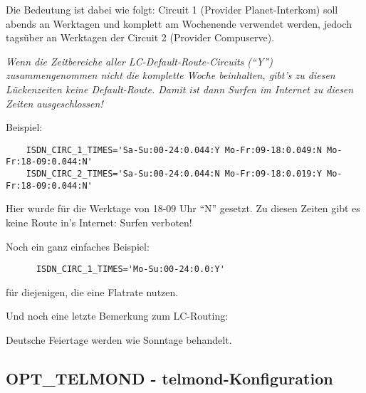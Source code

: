 \begin{description}
    Die Bedeutung ist dabei wie folgt: Circuit 1 (Provider
    Planet-Interkom) soll abends an Werktagen und komplett am
    Wochenende verwendet werden, jedoch tagsüber an Werktagen der
    Circuit 2 (Provider Compuserve).

    \begin{description}
    \item {}
      
     \emph{Wenn die Zeitbereiche aller LC-Default-Route-Circuits (``Y'')
     zusammengenommen nicht die komplette Woche beinhalten, gibt's zu
     diesen Lückenzeiten keine Default-Route. Damit ist dann Surfen
     im Internet zu diesen Zeiten ausgeschlossen!}

        
    \item Beispiel:
\begin{example}
\begin{verbatim}
    ISDN_CIRC_1_TIMES='Sa-Su:00-24:0.044:Y Mo-Fr:09-18:0.049:N Mo-Fr:18-09:0.044:N'
    ISDN_CIRC_2_TIMES='Sa-Su:00-24:0.044:N Mo-Fr:09-18:0.019:Y Mo-Fr:18-09:0.044:N'
\end{verbatim}
\end{example}
      
      Hier wurde für die Werktage von 18-09 Uhr ``N'' gesetzt. Zu diesen Zeiten
      gibt es keine Route in's Internet: Surfen verboten!

      
    \item Noch ein ganz einfaches Beispiel:

\begin{example}
\begin{verbatim}
      ISDN_CIRC_1_TIMES='Mo-Su:00-24:0.0:Y'        
\end{verbatim}
\end{example}
      
      für diejenigen, die eine Flatrate nutzen.


      
    \item Und noch eine letzte Bemerkung zum LC-Routing:
      
      Deutsche Feiertage werden wie Sonntage behandelt.
    \end{description}

\end{description}

\subsection {OPT\_TELMOND - telmond-Konfiguration}


